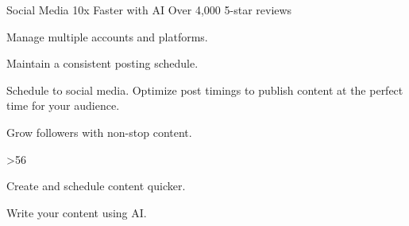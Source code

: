 Social Media 10x Faster with AI
  Over 4,000 5-star reviews

  Manage multiple accounts and platforms.

  Maintain a consistent posting schedule.

  Schedule to social media.
  Optimize post timings to publish content at the perfect time for your audience.
  
  Grow followers with non-stop content.

  >56%
  
  Create and schedule content quicker.

  Write your content using AI.
  